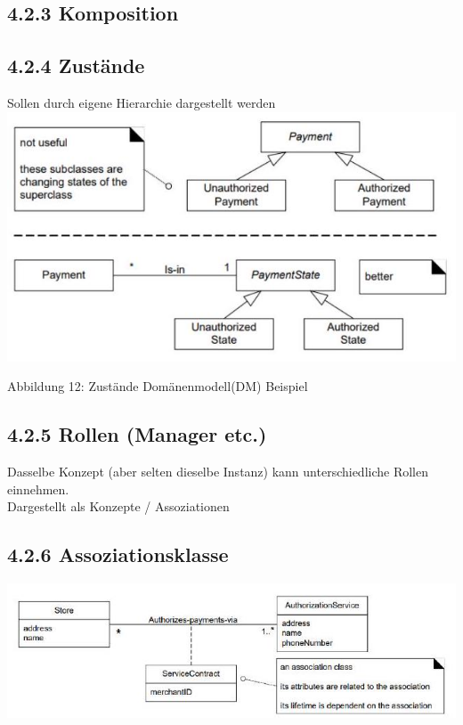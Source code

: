 \documentclass[10pt]{article}
\begin{document}
\subsection*{4.2.3 Komposition}
\subsection*{4.2.4 Zustände}
Sollen durch eigene Hierarchie dargestellt werden\\
\includegraphics[width=\linewidth]{images/2024_12_29_0d1d7b5551ea1b4b41bdg-07(1)}

Abbildung 12: Zustände Domänenmodell(DM) Beispiel

\subsection*{4.2.5 Rollen (Manager etc.)}
Dasselbe Konzept (aber selten dieselbe Instanz) kann unterschiedliche Rollen einnehmen.\\
Dargestellt als Konzepte / Assoziationen

\subsection*{4.2.6 Assoziationsklasse}
\begin{center}
\includegraphics[width=\linewidth]{images/2024_12_29_0d1d7b5551ea1b4b41bdg-07}
\end{center}
\end{document}

